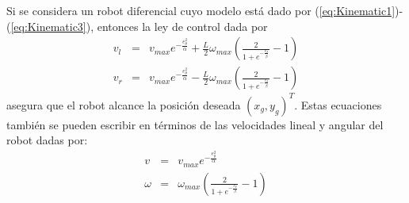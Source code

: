 \documentclass[letterpaper,12pt]{article}
\begin{document}


Si se considera un robot diferencial cuyo modelo está dado por (\ref{eq:Kinematic1})-(\ref{eq:Kinematic3}), entonces la ley de control dada por 
\begin{eqnarray} 
v_{l} &=& v_{max}e^{-\frac{e_{\theta}^{2}}{\alpha}} + 
\frac{L}{2}\omega_{max}\left(\frac{2}{1+e^{-\frac{e_{\theta}}{\beta}}}-1\right)\label{eq:Control21}\\
v_{r} &=& v_{max}e^{-\frac{e_{\theta}^{2}}{\alpha}} -
\frac{L}{2}\omega_{max}\left(\frac{2}{1+e^{-\frac{e_{\theta}}{\beta}}}-1\right)\label{eq:Control22}
\end{eqnarray}
asegura que el robot alcance la posición deseada $\left(x_g, y_g\right)^T$. Estas ecuaciones también se pueden escribir en términos de las velocidades lineal y angular del robot dadas por:
\begin{eqnarray*}
  v      &=& v_{max}e^{-\frac{e_{\theta}^{2}}{\alpha}}\\
  \omega &=& \omega_{max}\left(\frac{2}{1+e^{-\frac{e_{\theta}}{\beta}}}-1\right)
\end{eqnarray*}
\end{document}
